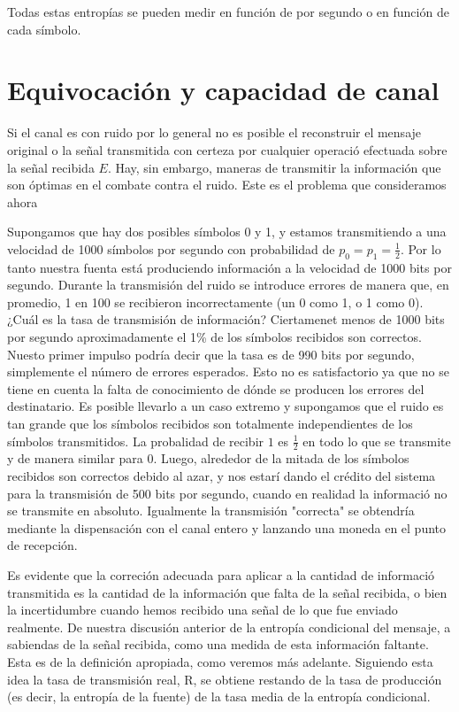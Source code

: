 Todas estas entrop\'{i}as se pueden medir en funci\'{o}n de por segundo o en funci\'{o}n de cada s\'{i}mbolo.

\clearpage

\chapter{Equivocaci\'{o}n y capacidad de canal}
\label{sec:12}

Si el canal es con ruido por lo general no es posible el reconstruir el mensaje original o la se\~{n}al transmitida con certeza por cualquier operaci\'{o} efectuada sobre la se\~{n}al recibida $E$. Hay, sin embargo, maneras de transmitir la informaci\'{o}n que son \'{o}ptimas en el combate contra el ruido. Este es el problema que consideramos ahora

Supongamos que hay dos posibles s\'{i}mbolos 0 y 1, y estamos transmitiendo a una velocidad de 1000 s\'{i}mbolos por segundo con probabilidad de $p_{0} = p_{1} = \frac{1}{2}$. Por lo tanto nuestra fuenta est\'{a} produciendo informaci\'{o}n a la velocidad de 1000 bits por segundo. Durante la transmisi\'{o}n del ruido se introduce errores de manera que, en promedio, 1 en 100 se recibieron incorrectamente (un 0 como 1, o 1 como 0). ¿Cu\'{a}l es la tasa de transmisi\'{o}n de informaci\'{o}n? Ciertamenet menos de 1000 bits por segundo aproximadamente el 1\% de los s\'{i}mbolos recibidos son correctos. Nuesto primer impulso podr\'{i}a decir que la tasa es de 990 bits por segundo, simplemente el n\'{u}mero de errores esperados. Esto no es satisfactorio ya que no se tiene en cuenta la falta de conocimiento de d\'{o}nde se producen los errores del destinatario. Es posible llevarlo a un caso extremo y supongamos que el ruido es tan grande que los s\'{i}mbolos recibidos son totalmente independientes de los s\'{i}mbolos transmitidos. La probalidad de recibir $1$ es $\frac{1}{2}$ en todo lo que se transmite y de manera similar para 0. Luego, alrededor de la mitada de los s\'{i}mbolos recibidos son correctos debido al azar, y nos estar\'{i} dando el cr\'{e}dito del sistema para la transmisi\'{o}n de 500 bits por segundo, cuando en realidad la informaci\'{o} no se transmite en absoluto. Igualmente la transmisi\'{o}n "correcta" se obtendr\'{i}a mediante la dispensaci\'{o}n con el canal entero y lanzando una moneda en el punto de recepci\'{o}n.

Es evidente que la correci\'{o}n adecuada para aplicar a la cantidad de informaci\'{o} transmitida es la cantidad de la informaci\'{o}n que falta de la se\~{n}al recibida, o bien la incertidumbre cuando hemos recibido una se\~{n}al de lo que fue enviado realmente. De nuestra discusi\'{o}n anterior de la entrop\'{i}a condicional del mensaje, a sabiendas de la se\~{n}al recibida, como una medida de esta informaci\'{o}n faltante. Esta es de la definici\'{o}n apropiada, como veremos m\'{a}s adelante. Siguiendo esta idea la tasa de transmisi\'{o}n real, R, se obtiene restando de la tasa de producci\'{o}n (es decir, la entrop\'{i}a de la fuente) de la tasa media de la entrop\'{i}a condicional.

